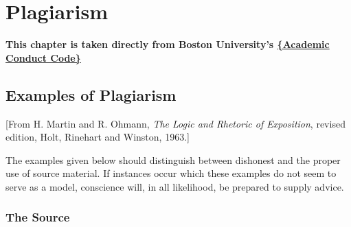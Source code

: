 

\chapter{Plagiarism}
\textbf{This chapter is taken directly from Boston University's \href{http://www.bu.edu/academics/resources/academic-conduct-code/}{\{Academic Conduct Code\}}}

\section{Examples of Plagiarism}

[From H. Martin and R. Ohmann, \emph{The Logic and Rhetoric of Exposition}, revised edition, Holt, Rinehart and Winston, 1963.]

The examples given below should distinguish between dishonest and the proper use of source material. If instances occur which these examples do not seem to serve as a model, conscience will, in all likelihood, be prepared to supply advice.

\subsection{The Source}

